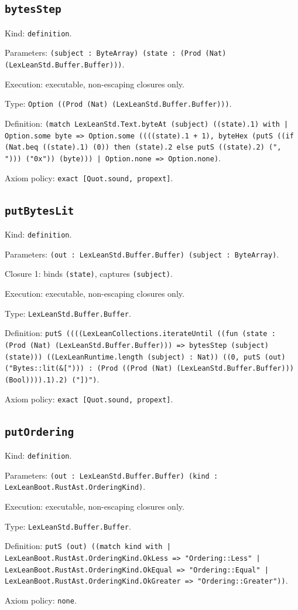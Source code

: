 \documentclass[11pt]{article}
\begin{document}
\subsection*{\texttt{bytesStep}}
\noindent Kind: \texttt{definition}.\par
\noindent Parameters: \texttt{(subject : ByteArray) (state : (Prod (Nat) (LexLeanStd.Buffer.Buffer)))}.\par
\noindent Execution: executable, non-escaping closures only.\par
\noindent Type: \texttt{Option ((Prod (Nat) (LexLeanStd.Buffer.Buffer)))}.\par
\noindent Definition: \texttt{(match LexLeanStd.Text.byteAt (subject) ((state).1) with | Option.some byte => Option.some ((((state).1 + 1), byteHex (putS ((if (Nat.beq ((state).1) (0)) then (state).2 else putS ((state).2) (", "))) ("0x")) (byte))) | Option.none => Option.none)}.\par
\noindent Axiom policy: \texttt{exact [Quot.sound, propext]}.\par
\subsection*{\texttt{putBytesLit}}
\noindent Kind: \texttt{definition}.\par
\noindent Parameters: \texttt{(out : LexLeanStd.Buffer.Buffer) (subject : ByteArray)}.\par
\noindent Closure 1: binds \texttt{(state)}, captures \texttt{(subject)}.\par
\noindent Execution: executable, non-escaping closures only.\par
\noindent Type: \texttt{LexLeanStd.Buffer.Buffer}.\par
\noindent Definition: \texttt{putS ((((LexLeanCollections.iterateUntil ((fun (state : (Prod (Nat) (LexLeanStd.Buffer.Buffer))) => bytesStep (subject) (state))) ((LexLeanRuntime.length (subject) : Nat)) ((0, putS (out) ("Bytes::lit(\&["))) : (Prod ((Prod (Nat) (LexLeanStd.Buffer.Buffer))) (Bool)))).1).2) ("])")}.\par
\noindent Axiom policy: \texttt{exact [Quot.sound, propext]}.\par
\subsection*{\texttt{putOrdering}}
\noindent Kind: \texttt{definition}.\par
\noindent Parameters: \texttt{(out : LexLeanStd.Buffer.Buffer) (kind : LexLeanBoot.RustAst.OrderingKind)}.\par
\noindent Execution: executable, non-escaping closures only.\par
\noindent Type: \texttt{LexLeanStd.Buffer.Buffer}.\par
\noindent Definition: \texttt{putS (out) ((match kind with | LexLeanBoot.RustAst.OrderingKind.OkLess => "Ordering::Less" | LexLeanBoot.RustAst.OrderingKind.OkEqual => "Ordering::Equal" | LexLeanBoot.RustAst.OrderingKind.OkGreater => "Ordering::Greater"))}.\par
\noindent Axiom policy: \texttt{none}.\par
\end{document}
